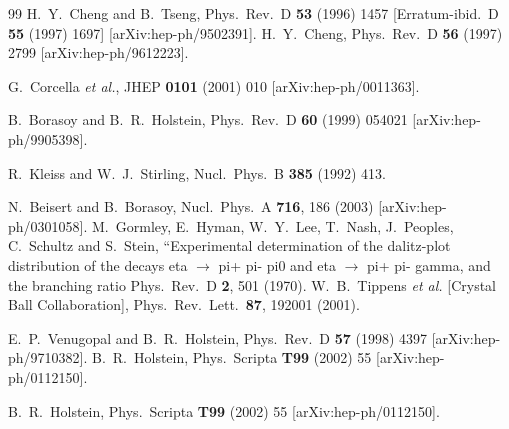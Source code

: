 \documentclass{article}
\begin{document}
\begin{thebibliography}{99}
  H.~Y.~Cheng and B.~Tseng,
  Phys.\ Rev.\  D {\bf 53} (1996) 1457
  [Erratum-ibid.\  D {\bf 55} (1997) 1697]
  [arXiv:hep-ph/9502391].
  H.~Y.~Cheng,
  Phys.\ Rev.\  D {\bf 56} (1997) 2799
  [arXiv:hep-ph/9612223].

  G.~Corcella {\it et al.},
  JHEP {\bf 0101} (2001) 010
  [arXiv:hep-ph/0011363].

B.~Borasoy and B.~R.~Holstein,
Phys.\ Rev.\  D {\bf 60} (1999) 054021 [arXiv:hep-ph/9905398].

 R.~Kleiss and W.~J.~Stirling,
Nucl.\ Phys.\  B {\bf 385} (1992) 413.

  N.~Beisert and B.~Borasoy,
  Nucl.\ Phys.\  A {\bf 716}, 186 (2003)
  [arXiv:hep-ph/0301058].
  M.~Gormley, E.~Hyman, W.~Y.~Lee, T.~Nash, J.~Peoples, C.~Schultz and S.~Stein,
   ``Experimental determination of the dalitz-plot distribution of the decays
   eta $\to$ pi+ pi- pi0 and eta $\to$ pi+ pi- gamma, and the branching ratio
  Phys.\ Rev.\  D {\bf 2}, 501 (1970).
  W.~B.~Tippens {\it et al.}  [Crystal Ball Collaboration],
  Phys.\ Rev.\ Lett.\  {\bf 87}, 192001 (2001).

 E.~P.~Venugopal and B.~R.~Holstein,
Phys.\ Rev.\  D {\bf 57} (1998) 4397 [arXiv:hep-ph/9710382].
 B.~R.~Holstein,
 Phys.\ Scripta {\bf T99} (2002) 55 [arXiv:hep-ph/0112150].

 B.~R.~Holstein,
 Phys.\ Scripta {\bf T99} (2002) 55 [arXiv:hep-ph/0112150].


\end{thebibliography}
\end{document}
